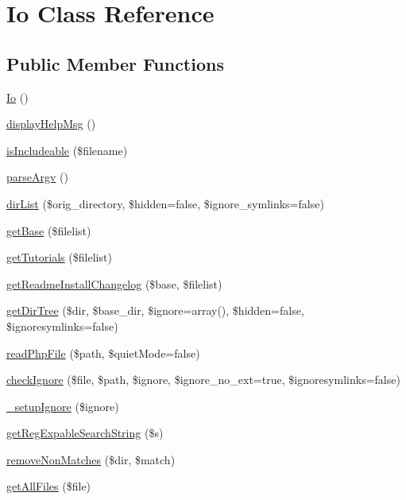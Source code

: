 \hypertarget{class_io}{\section{\-Io \-Class \-Reference}
\label{class_io}
}
\subsection*{\-Public \-Member \-Functions}
\begin{DoxyCompactItemize}
\item 
\hyperlink{class_io_a06c53f7ade2c0d7ecfcf0dd43cdf7c2a}{\-Io} ()
\item 
\hyperlink{class_io_a6d3f066f0f7d9309955b2abcd041ce1e}{display\-Help\-Msg} ()
\item 
\hyperlink{class_io_a4668c755fe05cf5830a372ef8192b296}{is\-Includeable} (\$filename)
\item 
\hyperlink{class_io_af4e34ed91ae0971aa317016bbd76b8c3}{parse\-Argv} ()
\item 
\hyperlink{class_io_ae69759b99d87ff76dab26d949dcc6375}{dir\-List} (\$orig\-\_\-directory, \$hidden=false, \$ignore\-\_\-symlinks=false)
\item 
\hyperlink{class_io_a1b741082ed70fa3f651f2d6b3bc490e0}{get\-Base} (\$filelist)
\item 
\hyperlink{class_io_ad81918c0ee4adcab5021fcdfb884ae93}{get\-Tutorials} (\$filelist)
\item 
\hyperlink{class_io_ab535890ea7d666e40242e4f5fbed98af}{get\-Readme\-Install\-Changelog} (\$base, \$filelist)
\item 
\hyperlink{class_io_a01e3d460c3f8bb4e395297b06f87b907}{get\-Dir\-Tree} (\$dir, \$base\-\_\-dir, \$ignore=array(), \$hidden=false, \$ignoresymlinks=false)
\item 
\hyperlink{class_io_a3da7f918cda1c8b26d039ee5cb6a7bd9}{read\-Php\-File} (\$path, \$quiet\-Mode=false)
\item 
\hyperlink{class_io_a4f9de5a3e3b11044f8357c100cff4a01}{check\-Ignore} (\$file, \$path, \$ignore, \$ignore\-\_\-no\-\_\-ext=true, \$ignoresymlinks=false)
\item 
\hyperlink{class_io_a0562705cfbd6d306bbd5fd29ee05c843}{\-\_\-setup\-Ignore} (\$ignore)
\item 
\hyperlink{class_io_aafee2b952da0ae6707d4b3ed6647c9f7}{get\-Reg\-Expable\-Search\-String} (\$s)
\item 
\hyperlink{class_io_a24ad1cd15c2cf72a1c21b2dd9799757c}{remove\-Non\-Matches} (\$dir, \$match)
\item 
\hyperlink{class_io_aabbeea8fa9fbec7fe341f79e49833302}{get\-All\-Files} (\$file)
\end{DoxyCompactItemize}

